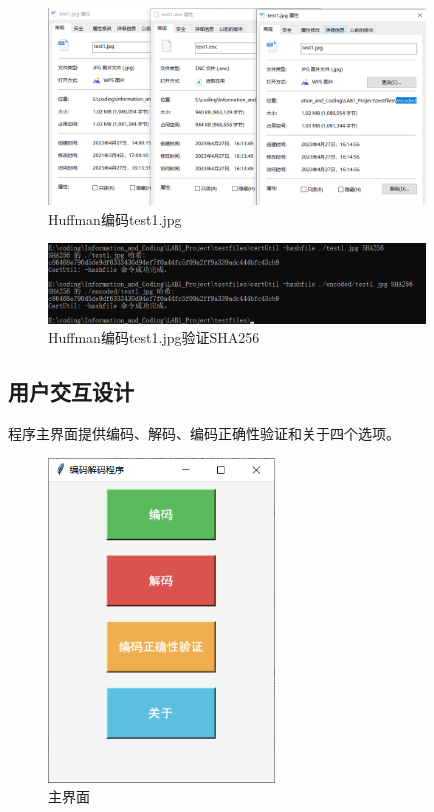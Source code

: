 \documentclass[12pt, a4paper]{ctexart}
\begin{document}
    \begin{figure}[H]
    \centering
    \includegraphics[width=10cm]{./pic/3-1.png}		
    \caption{Huffman编码test1.jpg}
    \end{figure}
    \begin{figure}[H]
    \centering
    \includegraphics[width=10cm]{./pic/3-2.png}		
    \caption{Huffman编码test1.jpg验证SHA256}
    \end{figure}

    \subsection{用户交互设计}
    
    程序主界面提供编码、解码、编码正确性验证和关于四个选项。
    
    \begin{figure}[H]
    \centering
    \includegraphics[width=6cm]{./pic/4-1.png}		
    \caption{主界面}
    \end{figure}
\end{document}
